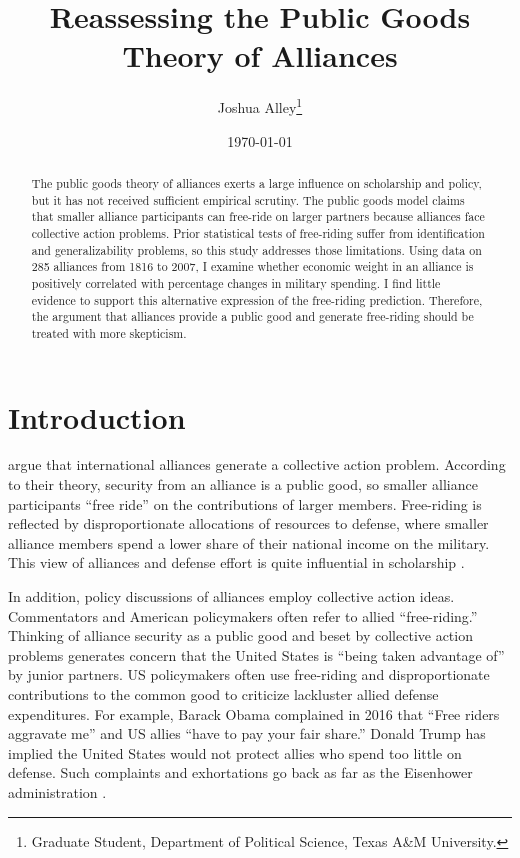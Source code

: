 \documentclass[12pt]{article}
\title{
\textbf{Reassessing the Public Goods Theory of Alliances}
	}
\author{Joshua Alley\footnote{Graduate Student,
Department of Political Science, Texas A\&M University.}}
\date{{\normalsize \today}}
\begin{document}
\maketitle 

\doublespace

\begin{abstract}
The public goods theory of alliances exerts a large influence on scholarship and policy, but it has not received sufficient empirical scrutiny. 
The public goods model claims that smaller alliance participants can free-ride on larger partners because alliances face collective action problems. 
Prior statistical tests of free-riding suffer from identification and generalizability problems, so this study addresses those limitations. 
Using data on 285 alliances from 1816 to 2007, I examine whether economic weight in an alliance is positively correlated with percentage changes in military spending. 
I find little evidence to support this alternative expression of the free-riding prediction. 
Therefore, the argument that alliances provide a public good and generate free-riding should be treated with more skepticism. 

\end{abstract} 

\newpage


\section{Introduction}



\citet{OlsonZeckhauser1966} argue that international alliances generate a collective action problem. 
According to their theory, security from an alliance is a public good, so smaller alliance participants ``free ride'' on the contributions of larger members. 
Free-riding is reflected by disproportionate allocations of resources to defense, where smaller alliance members spend a lower share of their national income on the military.
This view of alliances and defense effort is quite influential in scholarship \citep{Walt1990, Mearsheimer1994, Goldstein1995, SandlerHartley2001, Garfinkel2004, Walt2009, Norrlof2010, Barrett2010, PluemperNeumayer2015}. 


In addition, policy discussions of alliances employ collective action ideas.
Commentators and American policymakers often refer to allied ``free-riding.'' 
Thinking of alliance security as a public good and beset by collective action problems generates concern that the United States is ``being taken advantage of'' by junior partners. 
US policymakers often use free-riding and disproportionate contributions to the common good to criticize lackluster allied defense expenditures.  
For example, Barack Obama complained in 2016 that ``Free riders aggravate me'' and US allies ``have to pay your fair share.'' 
Donald Trump has implied the United States would not protect allies who spend too little on defense. 
Such complaints and exhortations go back as far as the Eisenhower administration \citep{Lanoszka2015}.
\end{document}
